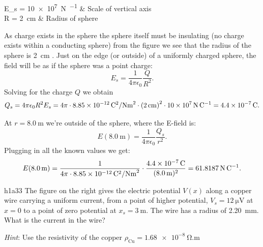   \begin{givens}
    E_s = \qty{10e7}{\N\per\C}  & Scale of vertical axis \\
    R = \qty{2}{\cm} & Radius of sphere
  \end{givens}

  \begin{derivation}
    As charge exists in the sphere the sphere itself must be insulating (no charge exists within a conducting sphere) from the figure we see that the radius of the sphere is \qty{2}{\cm} .
    Just on the edge (or outside) of a uniformly charged sphere, the field will be as if the sphere was a point charge:
    \begin{equation*}
      E_s = \frac{1}{4\pi \epsilon_0} \frac{Q}{R^2}
    .\end{equation*}
    Solving for the charge $Q$ we obtain
    \begin{equation*}
      Q_s = 4 \pi \epsilon_0 R^2 E_s = 4\pi \cdot \qty{8,85e-12}{\C^2\per\N\m^2}  \cdot \left( \qty{2}{\cm}  \right)^2 \cdot \qty{10e7}{\N\per\C} = \qty{4,4e-7}{\C} 
    .\end{equation*}
    
    At $r = \qty{8,0}{\m}$ we're outside of the sphere, where the E-field is:
    \begin{equation*}
      E(\qty{8,0}{\m})= \frac{1}{4\pi \epsilon_0} \frac{Q_s}{r^2}
    .\end{equation*}
    Plugging in all the known values we get:
    \begin{equation*}
      E (\qty{8,0}{\m} )= \frac{1}{4\pi \cdot \qty{8,85e-12}{\C^2\per\N\m^2} } \cdot \frac{\qty{4,4e-7}{\C}}{(\qty{8,0}{\m}) ^2} = \qty{61,8187}{\N\per\C} 
    .\end{equation*}
  \end{derivation}


  \begin{problemwithimage}{h1a3}{3}
    The figure on the right gives the electric potential $V(x)$ along a copper wire carrying a uniform current, from a point of higher potential, $V_s = \qty{12}{\micro\V}$ at $x = 0$ to a point of zero potential at $x_s = \qty{3}{\m}$.
    The wire has a radius of \qty{2,20}{\mm}.
    What is the current in the wire?

    \textit{Hint}: Use the resistivity of the copper $\rho_{\mathrm{Cu}} = \qty{1,68e-8}{\ohm.\m} $
  \end{problemwithimage}

